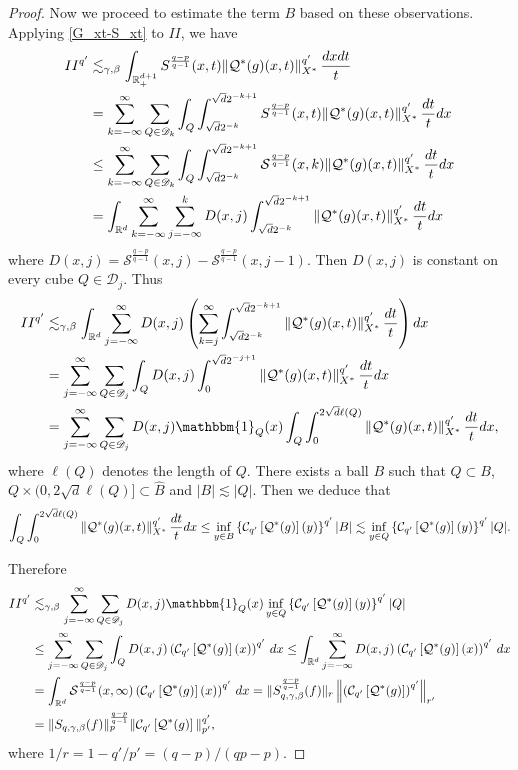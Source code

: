 \documentclass[oneside,english,a4wide]{amsart}
\numberwithin{equation}{section}
\numberwithin{figure}{section}
\theoremstyle{plain}
\theoremstyle{plain}
\theoremstyle{definition}
\theoremstyle{plain}
\theoremstyle{remark}
\theoremstyle{definition}
\theoremstyle{remark}
\theoremstyle{definition}
\newcommand{\real}{{\mathbb R}}
\newcommand{\D}{{\mathscr{D}}}
\renewcommand{\S}{\mathcal{S}}
\newcommand{\Q}{{\mathcal Q}}
\newcommand{\8}{+\infty}
\renewcommand{\1}{\mathbbm{1}}
\newcommand{\wh}{\widehat}
\newcommand\norm[1]{ \left\| #1 \right\| }
\newcommand\sk[1]{ \left( #1 \right) }
\newcommand\mk[1]{ \left[ #1 \right] }
\newcommand\lk[1]{ \left\{ #1 \right\} }
\renewcommand\d{{\rm d}}
\begin{document}
{\begin{proof}
Now we proceed to estimate the term $B$ based on these observations. {Applying \eqref{G_xt-S_xt} to $II$, we have}
\begin{align*}
  II^{q'} & \lesssim_{\gamma, \beta} \int_{\real^{d+1}_+} S^{\frac{q-p}{q-1}}(x,t)\| \Q^*(g)(x, t) \|_{X^*}^{q'}\,\frac{\d x\d t}{t} \\
   & = \sum_{k=-\infty}^{\infty} \sum_{Q \in \D_k} \int_Q\int_{\sqrt{d}2^{-k}}^{\sqrt{d}2^{-k+1}}S^{\frac{q-p}{q-1}}(x,t)\| \Q^*(g)(x, t) \|_{X^*}^{q'}\,\frac{\d t}{t}\d x \\
   & \leq \sum_{k=-\infty}^{\infty} \sum_{Q \in \D_k} \int_Q\int_{\sqrt{d}2^{-k}}^{\sqrt{d}2^{-k+1}}\S^{\frac{q-p}{q-1}}(x,k)\| \Q^*(g)(x, t) \|_{X^*}^{q'}\,\frac{\d t}{t}\d x \\
   & = \int_{\real^d} \sum_{k=-\infty}^{\infty} \sum_{j = -\infty}^{k} D(x,j)\int_{\sqrt{d}2^{-k}}^{\sqrt{d}2^{-k+1}}\| \Q^*(g)(x, t) \|_{X^*}^{q'}\,\frac{\d t}{t}\d x
\end{align*}
where $ D(x,j) = \S^{\frac{q-p}{q-1}}(x,j) - \S^{\frac{q-p}{q-1}}(x,j-1) $. Then $ D(x,j) $ is constant on every cube $ Q \in \D_j $. Thus
\begin{align*}
  II^{q'} & \lesssim_{\gamma,\beta} \int_{\real^d} \sum_{j=-\infty}^{\infty}D(x,j)\sk{ \sum_{k = j}^{\infty} \int_{\sqrt{d}2^{-k}}^{\sqrt{d}2^{-k+1}}\| \Q^*(g)(x, t) \|_{X^*}^{q'} \,\frac{\d t}{t} }\d x \\
   & = \sum_{j=-\infty}^{\infty} \sum_{Q \in \D_j} \int_Q D(x,j) \int_{0}^{\sqrt{d}2^{-j+1}}\| \Q^*(g)(x, t) \|_{X^*}^{q'}\,\frac{\d t}{t}\d x \\
   & = \sum_{j=-\infty}^{\infty} \sum_{Q\in\D_j}  D(x,j) \1_Q(x) \int_Q\int_{0}^{2\sqrt{d}\ell(Q)}\| \Q^*(g)(x, t) \|_{X^*}^{q'}\,\frac{\d t}{t}\d x,
\end{align*}
where $\ell(Q)$ denotes the length of $Q$. There exists a ball $ B $ such that $ Q \subset B$, $Q\times (0,2\sqrt{d}\ell(Q)] \subset \wh{B} $ and $  |B| \lesssim |Q| $. Then we deduce that
\[
    \int_Q\int_{0}^{2\sqrt{d}\ell(Q)}\| \Q^*(g)(x, t) \|_{X^*}^{q'}\,\frac{\d t}{t}\d x \leq \inf_{y\in B} \lk{\mathcal{C}_{q'}\mk{\Q^*(g)}(y)}^{q'}|B| \lesssim \inf_{y\in Q} \lk{\mathcal{C}_{q'}\mk{\Q^*(g)}(y)}^{q'}|Q|.
\]

Therefore
\begin{align*}
  II^{q'} & \lesssim_{\gamma,\beta} \sum_{j=-\infty}^{\infty} \sum_{Q\in\D_j}  D(x,j) \1_Q(x) \inf_{y\in Q} \lk{\mathcal{C}_{q'}\mk{\Q^*(g)}(y)}^{q'}|Q|\\
   & \leq \sum_{j=-\infty}^{\infty} \sum_{Q\in\D_j} \int_Q D(x,j) \sk{ \mathcal{C}_{q'}\mk{\Q^*(g) }(x) }^{q'}\,\d x \leq \int_{\real^d}\sum_{j=-\infty}^{\infty}D(x,j) \sk{ \mathcal{C}_{q'}\mk{\Q^*(g) }(x) }^{q'}\,\d x \\
   & = \int_{\real^d} \S^{\frac{q-p}{q-1}}(x,\infty)\sk{ \mathcal{C}_{q'}\mk{\Q^*(g) }(x) }^{q'}\,\d x = \| S^{\frac{q-p}{q-1}}_{q, \gamma,\beta}(f) \|_r \norm{ \sk{ \mathcal{C}_{q'}\mk{\Q^*(g) } }^{q'} }_{r'}  \\
   & = \| S_{q, \gamma,\beta}(f) \|_p^{\frac{q-p}{q-1}}\| \mathcal{C}_{q'}\mk{\Q^*(g)} \|_{p'}^{q'},
\end{align*}
where $1/r = 1 - q'/p' = (q-p)/(qp-p)$.


\end{proof}}
\end{document}
